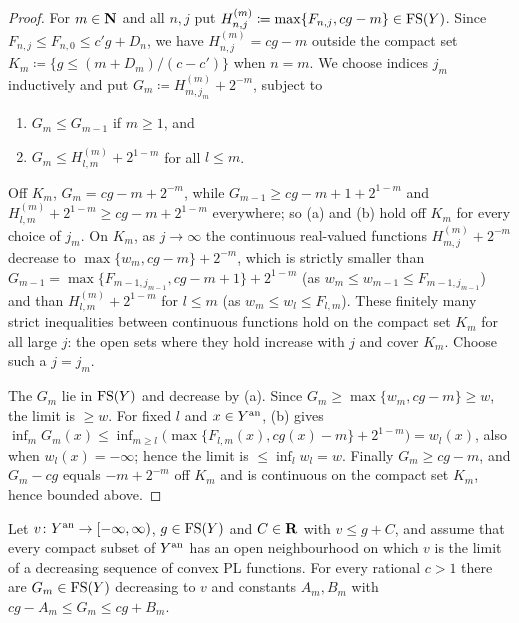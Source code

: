 \begin{proof}
For $m\in\mathbf{N}$ and all $n,j$ put $H^{(m)}_{n,j}\coloneqq\max\{F_{n,j},cg-m\}\in\mathrm{FS}(Y)$. Since
$F_{n,j}\le F_{n,0}\le c'g+D_n$, we have $H^{(m)}_{n,j}=cg-m$ outside the compact set
$K_m\coloneqq\{g\le(m+D_m)/(c-c')\}$ when $n=m$. We choose indices $j_m$ inductively and put
$G_m\coloneqq H^{(m)}_{m,j_m}+2^{-m}$, subject to
\begin{enumerate}
\item[(a)] $G_m\le G_{m-1}$ if $m\ge1$, and
\item[(b)] $G_m\le H^{(m)}_{l,m}+2^{1-m}$ for all $l\le m$.
\end{enumerate}
Off $K_m$, $G_m=cg-m+2^{-m}$, while $G_{m-1}\ge cg-m+1+2^{1-m}$ and $H^{(m)}_{l,m}+2^{1-m}\ge cg-m+2^{1-m}$
everywhere; so (a) and (b) hold off $K_m$ for every choice of $j_m$. On $K_m$, as $j\to\infty$ the continuous
real-valued functions $H^{(m)}_{m,j}+2^{-m}$ decrease to $\max\{w_m,cg-m\}+2^{-m}$, which is strictly smaller
than $G_{m-1}=\max\{F_{m-1,j_{m-1}},cg-m+1\}+2^{1-m}$ (as $w_m\le w_{m-1}\le F_{m-1,j_{m-1}}$) and than
$H^{(m)}_{l,m}+2^{1-m}$ for $l\le m$ (as $w_m\le w_l\le F_{l,m}$). These finitely many strict inequalities
between continuous functions hold on the compact set $K_m$ for all large $j$: the open sets where they hold
increase with $j$ and cover $K_m$. Choose such a $j=j_m$.

The $G_m$ lie in $\mathrm{FS}(Y)$ and decrease by (a). Since $G_m\ge\max\{w_m,cg-m\}\ge w$, the limit is $\ge w$.
For fixed $l$ and $x\in Y^{\mathrm{an}}$, (b) gives $\inf_mG_m(x)\le\inf_{m\ge l}\bigl(\max\{F_{l,m}(x),cg(x)-m\}+2^{1-m}\bigr)
=w_l(x)$, also when $w_l(x)=-\infty$; hence the limit is $\le\inf_lw_l=w$. Finally $G_m\ge cg-m$, and
$G_m-cg$ equals $-m+2^{-m}$ off $K_m$ and is continuous on the compact set $K_m$, hence bounded above.
\end{proof}

\begin{proposition}\label{prop:wu-main}
\leanok
{}
Let $v\colon Y^{\mathrm{an}}\to[-\infty,\infty)$, $g\in\mathrm{FS}(Y)$ and $C\in\mathbf{R}$ with $v\le g+C$, and assume that every compact
subset of $Y^{\mathrm{an}}$ has an open neighbourhood on which $v$ is the limit of a decreasing sequence of convex PL
functions. For every rational $c>1$ there are $G_m\in\mathrm{FS}(Y)$ decreasing to $v$ and constants $A_m,B_m$ with
$cg-A_m\le G_m\le cg+B_m$.
\end{proposition}


